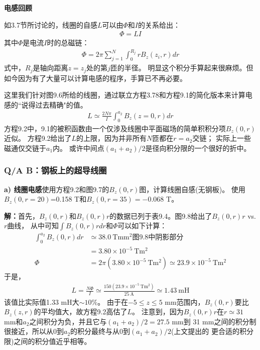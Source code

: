 \textbf{电感回顾}

如3.7节所讨论的，线圈的自感$L$可以由$\Phi$和$I$的关系给出：
\begin{align*}%
\Phi=LI \tag{3.78}
\end{align*}
其中$\Phi$是电流$I$时的总磁链：
\begin{align*}%
\Phi=2\pi\sum_{j=1}^{N}\int_{0}^{R_j}rB_z(z_i,r)dr \tag{9.1}
\end{align*}
式中，$R_j$是轴向距离$z=z_j$处的第$j$匝的半径。
明显这个积分手算起来很麻烦。但如今因为有了大量可以计算电感的程序，手算已不再必要。

这里我们针对图9.6所给的线圈，通过联立方程3.78和方程9.1的简化版本来计算电感的``说得过去精确"的值。
\begin{align*}%
L\simeq\frac{2N\pi}{I}\int_{0}^{a_2}B_z(z=0,r)dr \tag{9.2}
\end{align*}
方程9.2中，9.1的被积函数由一个仅涉及线圈中平面磁场的简单积积分项$B_z(0,r)$近似。
方程9.2给出了$L$的上限，因为并非所有$N$匝都在$r=a_2$交链；
实际上一些磁通仅交链于$a_1$内。
或许中间点$(a_1+a_2)/2$是径向积分限的一个很好的折中。


\subsubsection{Q/A B：钢板上的超导线圈}
\textbf{a) 线圈电感}\qquad 使用方程9.2和图9.7的$B_z(0,r)$图，计算线圈自感(无钢板)。
使用$B_z(0,r=20)$=0.158 T和$B_z(0,r=35)=-0.068$ T。

\textbf{解：}首先，$B_z(0,r)$和$B_z(0,r)r$的数据已列于表9.4。图9.8给出了$B_z(0,r)r$ vs. $r$曲线，
从中可知$\int B_z(0,r)rdr$和$\Phi$可以如下计算：
\begin{align*}%
\int_{0}^{a_2}B_z(0,r)dr&\simeq 38.0\ \mathrm{T mm^2}\mbox{图9.8中阴影部分}\\
&=3.80\times 10^{-5}\ \mathrm{Tm^2}\\
\Phi&=2\pi(3.80\times 10^{-5}\ \mathrm{Tm^2})\simeq 23.9\times 10^{-5}\ \mathrm{Tm^2}
\end{align*}
于是，
\begin{align*}%
L=\frac{N\Phi}{I}\simeq\frac{150(23.9\times 10^{-5}\ \mathrm{Tm^2})}{25\ \mathrm{A}}\simeq 1.43\ \mathrm{mH}
\end{align*}
该值比实际值1.33 mH大$\sim 10\%$。
由于在$-5\le z\le 5$ mm范围内，$B_z(0,r)$要比$B_z(z,r)$的平均值大，故方程9.2高估了$L$。
注意到，因为$B_z(0,r)r$在$r\simeq31$ mm和$a_2$之间积分为负，并且它与$(a_1+a_2)/2=27.5$ mm到
31 mm之间的积分制很接近，所以从0到$a_2$的积分最终与从0到$(a_1+a_2)/2$(上文提出的
更合适的积分限)之间的积分值近乎相等。

